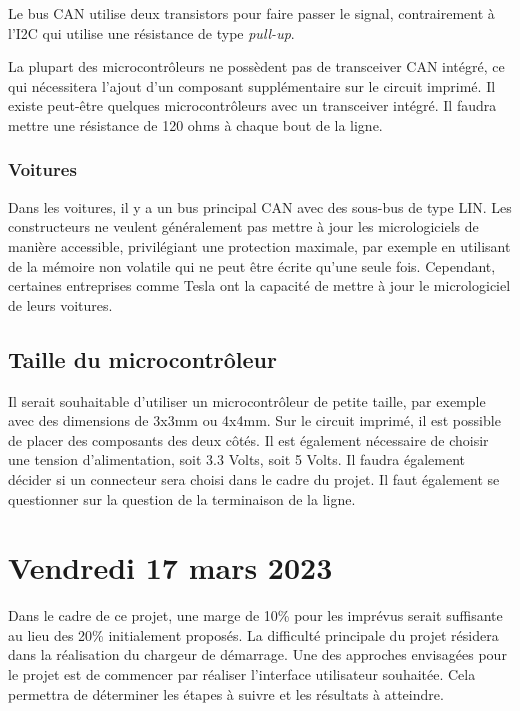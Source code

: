 Le bus CAN utilise deux transistors pour faire passer le signal, contrairement à l'I2C qui utilise une résistance de type \textit{pull-up}.

La plupart des microcontrôleurs ne possèdent pas de transceiver CAN intégré, ce qui nécessitera l'ajout d'un composant supplémentaire sur le circuit imprimé.
Il existe peut-être quelques microcontrôleurs avec un transceiver intégré.
Il faudra mettre une résistance de 120 ohms à chaque bout de la ligne.

\subsubsection{Voitures}

Dans les voitures, il y a un bus principal CAN avec des sous-bus de type LIN.
Les constructeurs ne veulent généralement pas mettre à jour les micrologiciels de manière accessible, privilégiant une protection maximale, par exemple en utilisant de la mémoire non volatile qui ne peut être écrite qu'une seule fois.
Cependant, certaines entreprises comme Tesla ont la capacité de mettre à jour le micrologiciel de leurs voitures.

\subsection{Taille du microcontrôleur}

Il serait souhaitable d'utiliser un microcontrôleur de petite taille, par exemple avec des dimensions de 3x3mm ou 4x4mm.
Sur le circuit imprimé, il est possible de placer des composants des deux côtés.
Il est également nécessaire de choisir une tension d'alimentation, soit 3.3 Volts, soit 5 Volts.
Il faudra également décider si un connecteur sera choisi dans le cadre du projet.
Il faut également se questionner sur la question de la terminaison de la ligne.

\section{Vendredi 17 mars 2023}

Dans le cadre de ce projet, une marge de 10\% pour les imprévus serait suffisante au lieu des 20\% initialement proposés.
La difficulté principale du projet résidera dans la réalisation du chargeur de démarrage. Une des approches envisagées pour le projet est de commencer par réaliser l'interface utilisateur souhaitée.
Cela permettra de déterminer les étapes à suivre et les résultats à atteindre.

